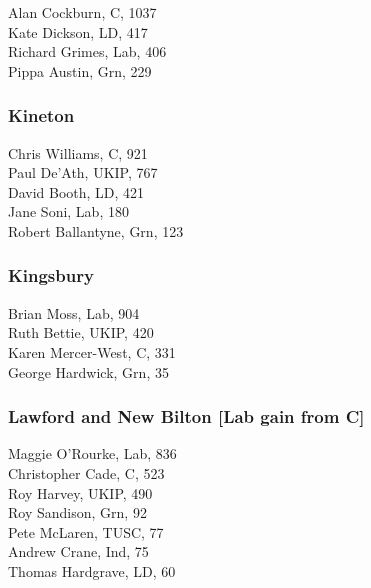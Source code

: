 \documentclass[a4paper,openany,10pt]{book}
\begin{document}


Alan Cockburn, C, 1037\\
Kate Dickson, LD, 417\\
Richard Grimes, Lab, 406\\
Pippa Austin, Grn, 229\\


\subsubsection*{Kineton}



Chris Williams, C, 921\\
Paul De'Ath, UKIP, 767\\
David Booth, LD, 421\\
Jane Soni, Lab, 180\\
Robert Ballantyne, Grn, 123\\


\subsubsection*{Kingsbury}



Brian Moss, Lab, 904\\
Ruth Bettie, UKIP, 420\\
Karen Mercer-West, C, 331\\
George Hardwick, Grn, 35\\


\subsubsection*{Lawford and New Bilton \hspace*{\fill}\nolinebreak[1]%
\enspace\hspace*{\fill}
[Lab gain from C]}



Maggie O'Rourke, Lab, 836\\
Christopher Cade, C, 523\\
Roy Harvey, UKIP, 490\\
Roy Sandison, Grn, 92\\
Pete McLaren, TUSC, 77\\
Andrew Crane, Ind, 75\\
Thomas Hardgrave, LD, 60\\
\end{document}
